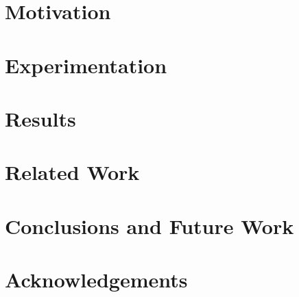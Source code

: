 \documentclass{llncs}
\begin{document}
\section{Motivation}
\label{sec:motivation}


\section{Experimentation}
\label{sec:method}

\section{Results}
\label{sec:results}
 

\section{Related Work}
\label{sec:related}


\section{Conclusions and Future Work}
\label{sec:conclusion}


\section{Acknowledgements}
\label{sec:ack}



%



\end{document}
